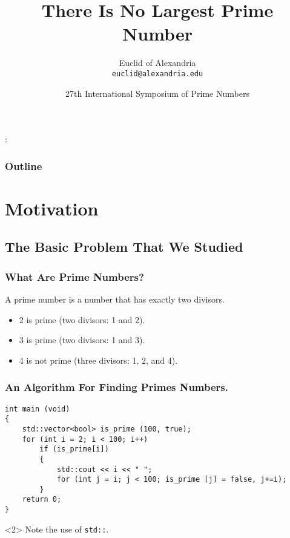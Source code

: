 \documentclass{beamer}
\title{There Is No Largest Prime Number}
\author[Euclid]{Euclid of Alexandria \\ \texttt{euclid@alexandria.edu}}
\date[ISPN ’80]{27th International Symposium of Prime Numbers}
\begin{document}
:
\begin{frame}
\titlepage
\end{frame}

\begin{frame}
\frametitle{Outline}
\tableofcontents[pausesections]
\end{frame}

\section{Motivation}
\subsection{The Basic Problem That We Studied}

\begin{frame}
\frametitle{What Are Prime Numbers?}
\begin{definition}
A \alert{prime number} is a number that has exactly two divisors.
\end{definition}
\begin{example}
\begin{itemize}
\item 2 is prime (two divisors: 1 and 2).
\item 3 is prime (two divisors: 1 and 3).
\item 4 is not prime (\alert{three} divisors: 1, 2, and 4).
\end{itemize}
\end{example}
\end{frame}

\begin{frame}[fragile]
\frametitle{An Algorithm For Finding Primes Numbers.}
\begin{verbatim}
int main (void)
{
	std::vector<bool> is_prime (100, true);
	for (int i = 2; i < 100; i++)
		if (is_prime[i])
		{
			std::cout << i << " ";
			for (int j = i; j < 100; is_prime [j] = false, j+=i);
		}
	return 0;
}
\end{verbatim}
\begin{uncoverenv}<2>
Note the use of \verb|std::|.
\end{uncoverenv}
\end{frame}
\end{document}
